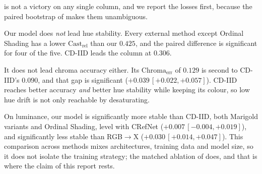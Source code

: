  is not a victory on any single column, and we report the losses first,
because the paired bootstrap of  makes them unambiguous.

Our model does \emph{not} lead hue stability. Every external method except Ordinal Shading
has a lower $\text{Cast}_{\text{rel}}$ than our $0.425$, and the paired difference is
significant for four of the five. CD-IID leads the column at $0.306$.

It does not lead chroma accuracy either. Its $\text{Chroma}_{\text{err}}$ of $0.129$ is second
to CD-IID's $0.090$, and that gap is significant ($+0.039\,[+0.022, +0.057]$). CD-IID reaches
better accuracy \emph{and} better hue stability while keeping its colour, so low hue drift is not only reachable by desaturating.

On luminance, our model is significantly more stable than CD-IID, both Marigold variants and
Ordinal Shading, level with CRefNet ($+0.007\,[-0.004, +0.019]$), and significantly less stable
than RGB$\rightarrow$X ($+0.030\,[+0.014, +0.047]$). This comparison across methods mixes
architectures, training data and model size, so it does not isolate the training strategy;
the matched ablation of  does, and that is where the claim of this report
rests.

